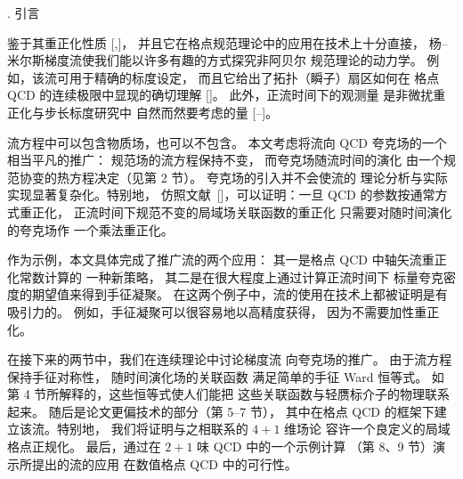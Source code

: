 
. 引言

鉴于其重正化性质
[\cite{WilsonFlow},\cite{RenFlow}]，
并且它在格点规范理论中的应用在技术上十分直接，
杨--米尔斯梯度流使我们能以许多有趣的方式探究非阿贝尔
规范理论的动力学。
例如，该流可用于精确的标度设定，
而且它给出了拓扑（瞬子）扇区如何在
格点 QCD 的连续极限中显现的确切理解
[\cite{WilsonFlow}]\kern1pt。
此外，正流时间下的观测量
是非微扰重正化与步长标度研究中
自然而然要考虑的量
[\cite{StepScaling}--\cite{FritzschRamos}]。

流方程中可以包含物质场，也可以不包含。
本文考虑将流向 QCD 夸克场的一个相当平凡的推广：
规范场的流方程保持不变，
而夸克场随流时间的演化
由一个规范协变的热方程决定（见第 2 节）。
夸克场的引入并不会使流的
理论分析与实际实现显著复杂化。特别地，
仿照文献~[\cite{RenFlow}]，可以证明：一旦 QCD 的参数按通常方式重正化，
正流时间下规范不变的局域场关联函数的重正化
只需要对随时间演化的夸克场作
一个乘法重正化。

作为示例，本文具体完成了推广流的两个应用：
其一是格点 QCD 中轴矢流重正化常数计算的
一种新策略，
其二是在很大程度上通过计算正流时间下
标量夸克密度的期望值来得到手征凝聚。
在这两个例子中，流的使用在技术上都被证明是有吸引力的。
例如，手征凝聚可以很容易地以高精度获得，
因为不需要加性重正化。

在接下来的两节中，我们在连续理论中讨论梯度流
向夸克场的推广。
由于流方程保持手征对称性，
随时间演化场的关联函数
满足简单的手征 Ward 恒等式。
如第 4 节所解释的，这些恒等式使人们能把
这些关联函数与轻赝标介子的物理联系起来。
随后是论文更偏技术的部分（第 5--7 节），
其中在格点 QCD 的框架下建立该流。特别地，
我们将证明与之相联系的 $4+1$ 维场论
容许一个良定义的局域格点正规化。
最后，通过在 $2+1$ 味 QCD 中的一个示例计算
（第 8、9 节）演示所提出的流的应用
在数值格点 QCD 中的可行性。
